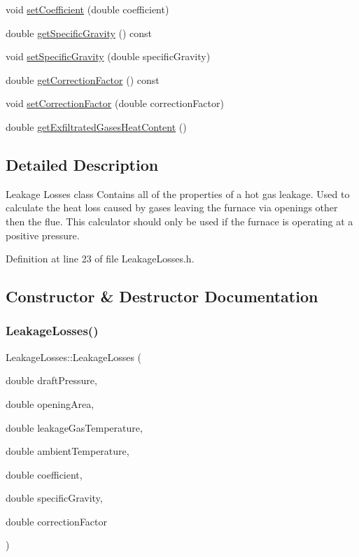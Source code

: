 \begin{DoxyCompactItemize}
\item 
void \hyperlink{class_leakage_losses_add2e96e75b6dd965370340dc03717434}{set\+Coefficient} (double coefficient)
\item 
double \hyperlink{class_leakage_losses_a37cd8c2282547246bab395424dad51d9}{get\+Specific\+Gravity} () const
\item 
void \hyperlink{class_leakage_losses_ab017828413655c5903374564e8718fac}{set\+Specific\+Gravity} (double specific\+Gravity)
\item 
double \hyperlink{class_leakage_losses_ad4f289a7490cd3fd4dfc4099fc4ad562}{get\+Correction\+Factor} () const
\item 
void \hyperlink{class_leakage_losses_a1af53750d5d9573dffa8674b3479e8d6}{set\+Correction\+Factor} (double correction\+Factor)
\item 
double \hyperlink{class_leakage_losses_a9663b916752bcf39a5482674e225e4a5}{get\+Exfiltrated\+Gases\+Heat\+Content} ()
\end{DoxyCompactItemize}


\subsection{Detailed Description}
Leakage Losses class Contains all of the properties of a hot gas leakage. Used to calculate the heat loss caused by gases leaving the furnace via openings other then the flue. This calculator should only be used if the furnace is operating at a positive pressure. 

Definition at line 23 of file Leakage\+Losses.\+h.



\subsection{Constructor \& Destructor Documentation}
\mbox{\label{class_leakage_losses_ab29a3d7c9561d73f2530fc376b528510}} 
\subsubsection{\texorpdfstring{Leakage\+Losses()}{LeakageLosses()}\hspace{0.1cm}{\footnotesize\ttfamily [1/3]}}
{\footnotesize\ttfamily Leakage\+Losses\+::\+Leakage\+Losses (\begin{DoxyParamCaption}\item[{double}]{draft\+Pressure,  }\item[{double}]{opening\+Area,  }\item[{double}]{leakage\+Gas\+Temperature,  }\item[{double}]{ambient\+Temperature,  }\item[{double}]{coefficient,  }\item[{double}]{specific\+Gravity,  }\item[{double}]{correction\+Factor }\end{DoxyParamCaption})\hspace{0.3cm}{\ttfamily [inline]}}

